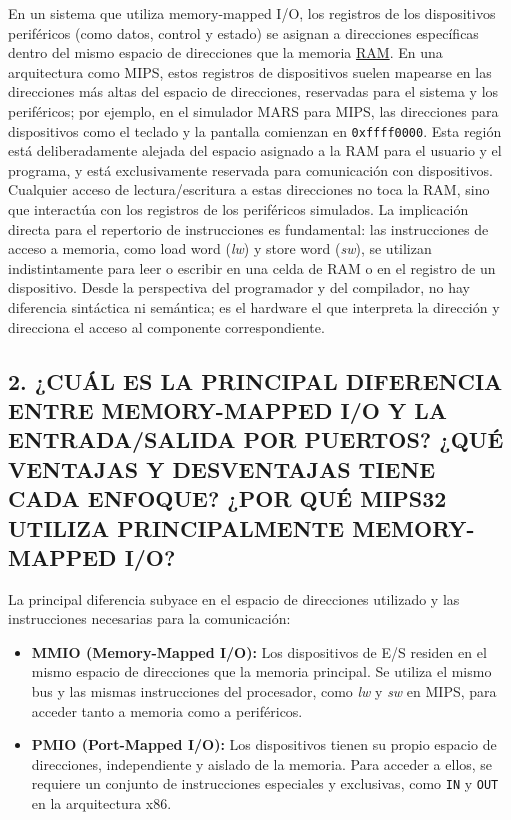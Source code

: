 \documentclass[12pt]{article}
\begin{document}
En un sistema que utiliza memory-mapped I/O, los registros de los dispositivos periféricos (como datos, control y estado) se asignan a direcciones específicas dentro del mismo espacio de direcciones que la memoria \underline{RAM}. En una arquitectura como MIPS, estos registros de dispositivos suelen mapearse en las direcciones más altas del espacio de direcciones, reservadas para el sistema y los periféricos; por ejemplo, en el simulador MARS para MIPS, las direcciones para dispositivos como el teclado y la pantalla comienzan en \texttt{0xffff0000}. Esta región está deliberadamente alejada del espacio asignado a la RAM para el usuario y el programa, y está exclusivamente reservada para comunicación con dispositivos. Cualquier acceso de lectura/escritura a estas direcciones no toca la RAM, sino que interactúa con los registros de los periféricos simulados. La implicación directa para el repertorio de instrucciones es fundamental: las instrucciones de acceso a memoria, como load word (\textit{lw}) y store word (\textit{sw}), se utilizan indistintamente para leer o escribir en una celda de RAM o en el registro de un dispositivo. Desde la perspectiva del programador y del compilador, no hay diferencia sintáctica ni semántica; es el hardware el que interpreta la dirección y direcciona el acceso al componente correspondiente.

\subsection*{2. ¿CUÁL ES LA PRINCIPAL DIFERENCIA ENTRE MEMORY-MAPPED I/O Y LA ENTRADA/SALIDA POR PUERTOS? ¿QUÉ VENTAJAS Y DESVENTAJAS TIENE CADA ENFOQUE? ¿POR QUÉ MIPS32 UTILIZA PRINCIPALMENTE MEMORY-MAPPED I/O?}

La principal diferencia subyace en el espacio de direcciones utilizado y las instrucciones necesarias para la comunicación:
\begin{itemize}
    \item \textbf{MMIO (Memory-Mapped I/O):} Los dispositivos de E/S residen en el mismo espacio de direcciones que la memoria principal. Se utiliza el mismo bus y las mismas instrucciones del procesador, como \textit{lw} y \textit{sw} en MIPS, para acceder tanto a memoria como a periféricos.
    \item \textbf{PMIO (Port-Mapped I/O):} Los dispositivos tienen su propio espacio de direcciones, independiente y aislado de la memoria. Para acceder a ellos, se requiere un conjunto de instrucciones especiales y exclusivas, como \texttt{IN} y \texttt{OUT} en la arquitectura x86.
\end{itemize}
\end{document}
